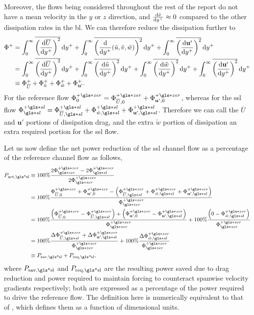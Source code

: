 Moreover, the flows being considered throughout the rest of the report do not have a mean velocity in the $y$ or $z$ direction, and $\dv{\tilde{v}}{y^{+}} \approx0$ compared to the other dissipation rates in the \gls*{bl}. We can therefore reduce the dissipation further to 
\begin{align}
	\Phi ^{+} &=\int_{0}^{\infty}  \overline{\left( \dv{\overline{U}}{y\ensuremath{^{+}}}  \right) ^2}\dd{y\ensuremath{^{+}}}+\int_{0}^{\infty}  \overline{\left( \dv{y\ensuremath{^{+}}}(\tilde{u},\tilde{v},\tilde{w})  \right) ^2} \dd{y\ensuremath{^{+}}} + \int_{0}^{\infty}  \overline{\left(\dv{\mathbf{u'} }{y\ensuremath{^{+}}}\right) ^2} \dd{y\ensuremath{^{+}}}\\
	&=\int_{0}^{\infty}  \overline{\left( \dv{\overline{U}}{y\ensuremath{^{+}}}  \right) ^2}\dd{y\ensuremath{^{+}}}+\int_{0}^{\infty}  \overline{\left( \dv{\tilde{u}}{y\ensuremath{^{+}}}  \right) ^2} \dd{y\ensuremath{^{+}}} +\int_{0}^{\infty}  \overline{\left( \dv{\tilde{w}}{y\ensuremath{^{+}}}  \right) ^2} \dd{y\ensuremath{^{+}}} + \int_{0}^{\infty}  \overline{\left(\dv{\mathbf{u'} }{y\ensuremath{^{+}}}\right) ^2} \dd{y\ensuremath{^{+}}}\\
	&\equiv \Phi_{\overline{U}}^{+} + \Phi _{\tilde{u}}^{+} + \Phi _{\tilde{w}}^{+} + \Phi _{\mathbf{u'} }^{+}
.\end{align}
For the reference flow $\Phi _{0}\pz=\Phi _{\overline{U},0}\pz+\Phi _{\mathbf{u'} ,0}\pz$, whereas for the \gls*{ssl} flow $\Phi \ssl\ps=\Phi _{\overline{U},\gls*{sl}}\ps + \Phi _{\tilde{w},\gls*{sl}}\ps + \Phi _{\mathbf{u'},\gls*{sl} }\ps$. Therefore we can call the $\overline{U}$ and $\mathbf{u'} $ portions of dissipation drag, and the extra $\tilde{w}$ portion of dissipation an extra required portion for the \gls*{ssl} flow.

Let us now define the net power reduction of the \gls*{ssl} channel flow as a percentage of the reference channel flow as follows,
\begin{align}
	P_\text{net,\gls*{sl}} &\equiv 100\% \frac{ 2\Phi \zz\pz-2\Phi \ssl\pz }{2\Phi \zz\pz} \\
			       &= 100\% \frac{\Phi _{\overline{U},0}\pz+\Phi _{\mathbf{u'} ,0}\pz-\left(\Phi _{\overline{U},\gls*{sl}}\pz + \Phi _{\tilde{w},\gls*{sl}}\pz + \Phi _{\mathbf{u'},\gls*{sl} }\pz\right)}{\Phi \zz\pz} \\
			       &= 100\% \frac{\left(\Phi _{\overline{U},0}\pz-\Phi _{\overline{U},\gls*{sl}}\pz\right)+\left(\Phi _{\mathbf{u'} ,0}\pz - \Phi _{\mathbf{u'},\gls*{sl} }\pz\right)}{\Phi \zz\pz}+100\%\frac{\left(0- \Phi _{\tilde{w},\gls*{sl}}\pz\right) }{\Phi \zz\pz} \\
			       &= 100\% \frac{\Delta\Phi _{\overline{U},\gls*{sl}}\pz+\Delta \Phi _{\mathbf{u'},\gls*{sl} }\pz}{\Phi \zz\pz}+100\%\frac{ \Delta\Phi _{\tilde{w},\gls*{sl}}\pz }{\Phi \zz\pz} \\
			       &\equiv P_\text{sav,\gls*{sl}} +  P_\text{req,\gls*{sl}} \label{eq:psavpreqsl}
,\end{align}
where $P_\text{sav,\gls*{sl}} $ and $P_\text{req,\gls*{sl}} $ are the resulting power saved due to drag reduction and power required to maintain forcing to counteract spanwise velocity gradients respectively; both are expressed as a percentage of the power required to drive the reference flow. The definition here is numerically equivalent to that of \textcite{viotti2009}, which defines them as a function of dimensional units.

